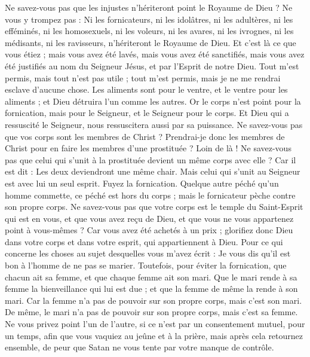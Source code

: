 \begin{multicols}{2}
Ne savez-vous pas que les injustes n'hériteront point le Royaume de Dieu ? Ne vous y trompez pas : Ni les fornicateurs, ni les idolâtres, ni les adultères,
ni les efféminés, ni les homosexuels, ni les voleurs, ni les avares, ni les ivrognes, ni les médisants, ni les ravisseurs, n'hériteront le Royaume de Dieu.
Et c’est là ce que vous étiez ; mais vous avez été lavés, mais vous avez été sanctifiés, mais vous avez été justifiés au nom du Seigneur Jésus, et par l'Esprit de notre Dieu.
Tout m’est permis, mais tout n’est pas utile ; tout m’est permis, mais je ne me rendrai esclave d’aucune chose.
Les aliments sont pour le ventre, et le ventre pour les aliments ; et Dieu détruira l'un comme les autres. Or le corps n'est point pour la fornication, mais pour le Seigneur, et le Seigneur pour le corps.
Et Dieu qui a ressuscité le Seigneur, nous ressuscitera aussi par sa puissance.
Ne savez-vous pas que vos corps sont les membres de Christ ? Prendrai-je donc les membres de Christ pour en faire les membres d'une prostituée ? Loin de là !
Ne savez-vous pas que celui qui s'unit à la prostituée devient un même corps avec elle ? Car il est dit : Les deux deviendront une même chair.
Mais celui qui s’unit au Seigneur est avec lui un seul esprit.
Fuyez la fornication. Quelque autre péché qu’un homme commette, ce péché est hors du corps ; mais le fornicateur pèche contre son propre corps.
Ne savez-vous pas que votre corps est le temple du Saint-Esprit qui est en vous, et que vous avez reçu de Dieu, et que vous ne vous appartenez point à vous-mêmes ?
Car vous avez été achetés à un prix ; glorifiez donc Dieu dans votre corps et dans votre esprit, qui appartiennent à Dieu.
\VerseOne{}Pour ce qui concerne les choses au sujet desquelles vous m'avez écrit : Je vous dis qu'il est bon à l'homme de ne pas se marier.
Toutefois, pour éviter la fornication, que chacun ait sa femme, et que chaque femme ait son mari.
Que le mari rende à sa femme la bienveillance qui lui est due ; et que la femme de même la rende à son mari.
Car la femme n'a pas de pouvoir sur son propre corps, mais c’est son mari. De même, le mari n'a pas de pouvoir sur son propre corps, mais c’est sa femme.
Ne vous privez point l'un de l'autre, si ce n'est par un consentement mutuel, pour un temps, afin que vous vaquiez au jeûne et à la prière, mais après cela retournez ensemble, de peur que Satan ne vous tente par votre manque de contrôle.

\end{multicols}
